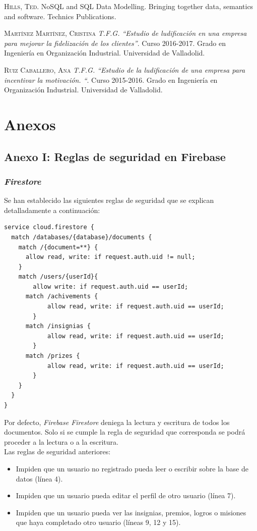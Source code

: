 \documentclass[twoside]{report}
\begin{document}
\begin{thebibliography}{a}
 \textsc{Hills, Ted}. NoSQL and SQL Data Modelling. Bringing together data, semantics and software. Technics Publications.

 \textsc{Martínez Martínez, Cristina} \textit{T.F.G. “Estudio de ludificación en una empresa para mejorar la fidelización de los clientes”}. Curso 2016-2017. Grado en Ingeniería en Organización Industrial. Universidad de Valladolid. 

 \textsc{Ruiz Caballero, Ana} \textit{T.F.G. “Estudio de la ludificación de una empresa para incentivar la motivación. “}. Curso 2015-2016. Grado en Ingeniería en Organización Industrial. Universidad de Valladolid. 

\end{thebibliography}

\part{Anexos}

\chapter*{Anexo I: Reglas de seguridad en Firebase}
\section*{\textit{Firestore}}
Se han establecido las siguientes reglas de seguridad que se explican detalladamente a continuación:

\begin{lstlisting}
service cloud.firestore {
  match /databases/{database}/documents {
    match /{document=**} {
      allow read, write: if request.auth.uid != null;
    }
    match /users/{userId}{
    	allow write: if request.auth.uid == userId;
      match /achivements {
    		allow read, write: if request.auth.uid == userId;
    	}
      match /insignias {
    		allow read, write: if request.auth.uid == userId;
    	}
      match /prizes {
    		allow read, write: if request.auth.uid == userId;
    	}
    }
  }
}
\end{lstlisting}

Por defecto, \textit{Firebase Firestore} deniega la lectura y escritura de todos los documentos. Solo si se cumple la regla de seguridad que corresponda se podrá proceder a la lectura o a la escritura. \\

Las reglas de seguridad anteriores:
\begin{itemize}
\item Impiden que un usuario no registrado pueda leer o escribir sobre la base de datos (línea 4).
\item Impiden que un usuario pueda editar el perfil de otro usuario (línea 7).
\item Impiden que un usuario pueda ver las insignias, premios, logros o misiones que haya completado otro usuario (líneas 9, 12 y 15).
\end{itemize}
\end{document}
